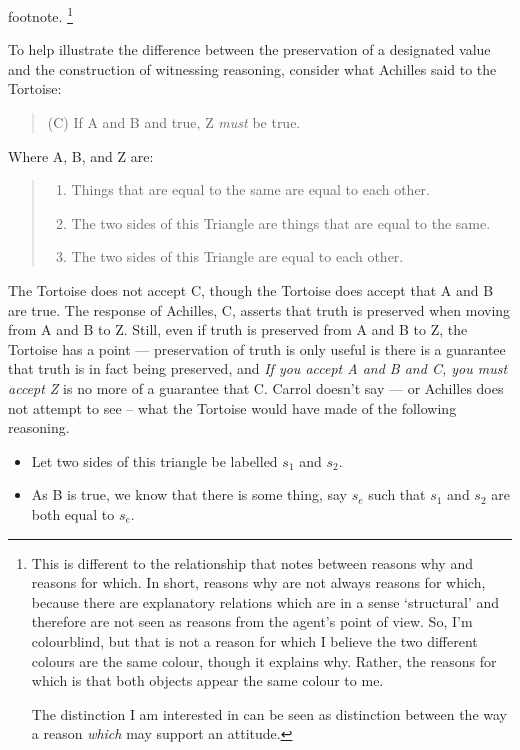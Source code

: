 \documentclass[10pt]{article}
\begin{document}
{
  \color{red}
  \citeauthor{Neta:2019aa} footnote.
}\nolinebreak
\footnote{
This is different to the relationship that \citeauthor{Neta:2019aa} notes between reasons why and reasons for which.
In short, reasons why are not always reasons for which, because there are explanatory relations which are in a sense `structural' and therefore are not seen as reasons from the agent's point of view.
So, I'm colourblind, but that is not a reason for which I believe the two different colours are the same colour, though it explains why.
Rather, the reasons for which is that both objects appear the same colour to me.

The distinction I am interested in can be seen as distinction between the way a reason \emph{which} may support an attitude.
}


\begin{note}
  To help illustrate the difference between the preservation of a designated value and the construction of witnessing reasoning, consider what Achilles said to the Tortoise:
  \begin{quote}
    (C) If A and B and true, Z \emph{must} be true.
  \end{quote}
  Where A, B, and Z are:
  \begin{quote}
    \begin{enumerate}
    \item Things that are equal to the same are equal to each other.
    \item The two sides of this Triangle are things that are equal to the same.
    \item The two sides of this Triangle are equal to each other.
    \end{enumerate}
  \end{quote}
  The Tortoise does not accept C, though the Tortoise does accept that A and B are true.
  The response of Achilles, C, asserts that truth is preserved when moving from A and B to Z.
  Still, even if truth is preserved from A and B to Z, the Tortoise has a point --- preservation of truth is only useful is there is a guarantee that truth is in fact being preserved, and \emph{If you accept A and B and C, you must accept Z} is no more of a guarantee that C.
  Carrol doesn't say --- or Achilles does not attempt to see -- what the Tortoise would have made of the following reasoning.
  \begin{itemize}
  \item Let two sides of this triangle be labelled \(s_{1}\) and \(s_{2}\).
  \item As B is true, we know that there is some thing, say \(s_{e}\) such that \(s_{1}\) and \(s_{2}\) are both equal to \(s_{e}\).

\end{itemize}
\end{note}
\end{document}
